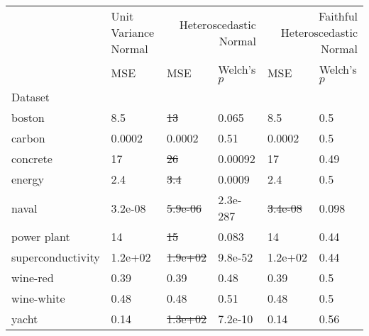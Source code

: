 \begin{tabular}{l|l|ll|ll}
\toprule
 & Unit Variance Normal & \multicolumn{2}{r}{Heteroscedastic Normal} & \multicolumn{2}{r}{Faithful Heteroscedastic Normal} \\
 & MSE & MSE & Welch's $p$ & MSE & Welch's $p$ \\
Dataset &  &  &  &  &  \\
\midrule
boston & 8.5 & \sout{13} & 0.065 & 8.5 & 0.5 \\
carbon & 0.0002 & 0.0002 & 0.51 & 0.0002 & 0.5 \\
concrete & 17 & \sout{26} & 0.00092 & 17 & 0.49 \\
energy & 2.4 & \sout{3.4} & 0.0009 & 2.4 & 0.5 \\
naval & 3.2e-08 & \sout{5.9e-06} & 2.3e-287 & \sout{3.4e-08} & 0.098 \\
power plant & 14 & \sout{15} & 0.083 & 14 & 0.44 \\
superconductivity & 1.2e+02 & \sout{1.9e+02} & 9.8e-52 & 1.2e+02 & 0.44 \\
wine-red & 0.39 & 0.39 & 0.48 & 0.39 & 0.5 \\
wine-white & 0.48 & 0.48 & 0.51 & 0.48 & 0.5 \\
yacht & 0.14 & \sout{1.3e+02} & 7.2e-10 & 0.14 & 0.56 \\
\bottomrule
\end{tabular}
